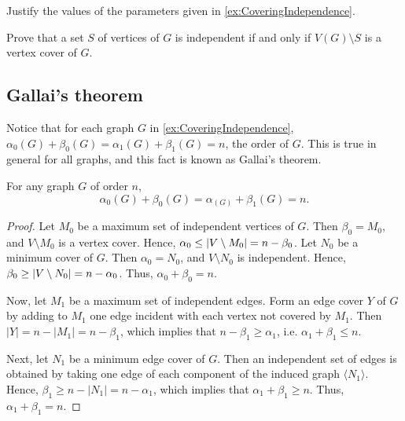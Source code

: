 \begin{Exercise}
Justify the values of the parameters given in \cref{ex:CoveringIndependence}.
\end{Exercise}

\begin{Exercise}
Prove that a set $S$ of vertices of $G$ is independent if and only if $V(G) \setminus S$ is a vertex cover of $G$.
\end{Exercise}

\subsection*{Gallai's theorem}
Notice that for each graph $G$ in \cref{ex:CoveringIndependence}, $\alpha_0(G) + \beta_0(G) = \alpha_1(G) + \beta_1(G) = n$, the order of $G$. This is true in general for all graphs, and this fact is known as Gallai's theorem.

\begin{Theorem}[Gallai]
For any graph $G$ of order $n$,
\begin{equation*}
\alpha_0(G) + \beta_0(G) = \alpha_(G) + \beta_1(G) = n.
\end{equation*}
\end{Theorem}

\begin{proof}
Let $M_0$ be a maximum set of independent vertices of $G$. Then $\beta_0 = M_0$, and $V \setminus M_0$ is a vertex cover. Hence, $\alpha_0 \le \vqty{V \setminus M_0} = n - \beta_0$. Let $N_0$ be a minimum cover of $G$. Then $\alpha_0 = N_0$, and $V \setminus N_0$ is independent. Hence, $\beta_0 \ge \vqty{V \setminus N_0} = n - \alpha_0$. Thus, $\alpha_0 + \beta_0 = n$.

Now, let $M_1$ be a maximum set of independent edges. Form an edge cover $Y$ of $G$ by adding to $M_1$ one edge incident with each vertex not covered by $M_1$. Then $|Y| = n - |M_1| = n - \beta_1$, which implies that $n - \beta_1 \ge \alpha_1$, i.e. $\alpha_1 + \beta_1 \le n$.

Next, let $N_1$ be a minimum edge cover of $G$. Then an independent set of edges is obtained by taking one edge of each component of the induced graph $\langle N_1 \rangle$. Hence, $\beta_1 \ge n - |N_1| = n - \alpha_1$, which implies that $\alpha_1 + \beta_1 \ge n$. Thus, $\alpha_1 + \beta_1 = n$.
\end{proof}


